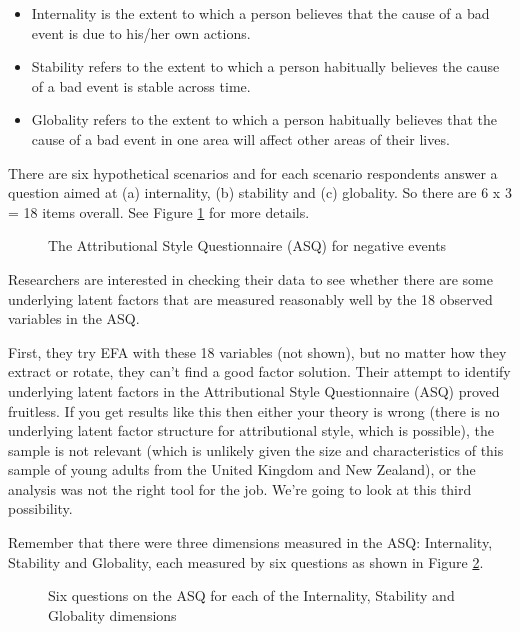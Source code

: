 \begin{itemize} \itemsep -2pt
\item Internality is the extent to which a person believes that the cause of a bad event is due to his/her own actions. 
\item Stability refers to the extent to which a person habitually believes the cause of a bad event is stable across time. 
\item Globality refers to the extent to which a person habitually believes that the cause of a bad event in one area will affect other areas of their lives.
\end{itemize}

There are six hypothetical scenarios and for each scenario respondents answer a question aimed at (a) internality, (b) stability and (c) globality. So there are 6 x 3 = 18 items overall. See Figure \ref{fig:MTMM1} for more details.

\begin{figure}[!htb]
\begin{center}
\caption{The Attributional Style Questionnaire (ASQ) for negative events}
\label{fig:MTMM1}
\HR
\end{center}
\end{figure}

Researchers are interested in checking their data to see whether there are some underlying latent factors that are measured reasonably well by the 18 observed variables in the ASQ. 

First, they try EFA with these 18 variables (not shown), but no matter how they extract or rotate, they can’t find a good factor solution. Their attempt to identify underlying latent factors in the Attributional Style Questionnaire (ASQ) proved fruitless. If you get results like this then either your theory is wrong (there is no underlying latent factor structure for attributional style, which is possible), the sample is not relevant (which is unlikely given the size and characteristics of this sample of young adults from the United Kingdom and New Zealand), or the analysis was not the right tool for the job. We’re going to look at this third possibility.

Remember that there were three dimensions measured in the ASQ: Internality, Stability and Globality, each measured by six questions as shown in Figure \ref{fig:MTMM2}. 

\begin{figure}[!htb]
\begin{center}
\caption{Six questions on the ASQ for each of the Internality, Stability and Globality dimensions}
\label{fig:MTMM2}
\HR
\end{center}
\end{figure}

